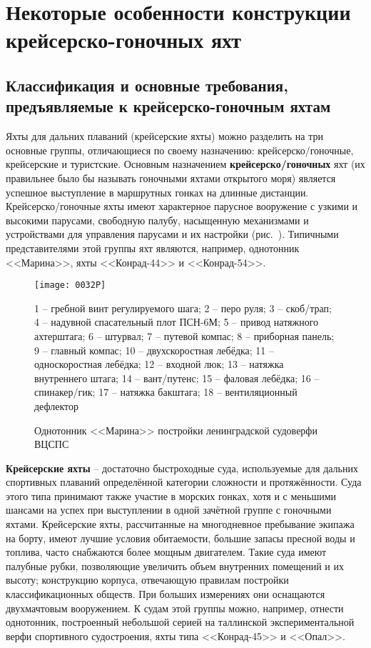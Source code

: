 \chapter{Некоторые особенности конструкции крейсерско-гоночных яхт}

\section{Классификация и основные требования, предъявляемые к крейсерско-гоночным яхтам}

Яхты для дальних плаваний (крейсерские яхты) можно разделить на три
основные группы, отличающиеся по своему назначению:
крейсерско\-/гоночные, крейсерские и туристские.  Основным назначением
\textbf{крейсерско\-/гоночных} яхт (их правильнее было бы называть
гоночными яхтами открытого моря) является успешное выступление в
маршрутных гонках на длинные дистанции. Крейсерско\-/гоночные яхты
имеют характерное парусное вооружение с узкими и высокими парусами,
свободную палубу, насыщенную механизмами и устройствами для управления
парусами и их настройки (рис.~). Типичными представителями
этой группы яхт являются, например, однотонник <<Марина>>, яхты
<<Конрад-44>> и <<Конрад-54>>.

\begin{figure*}[htb]
  \centering
  \texttt{[image: 0032P]}
  \caption{Однотонник <<Марина>> постройки ленинградской судоверфи ВЦСПС}
  \label{fig:32}
  \small
  \centering{}
  1 \--- гребной винт регулируемого шага; 2 \--- перо руля; 3 \--- скоб\-/трап; 4 \--- надувной спасательный плот ПСН-6М; 5 \--- привод натяжного ахтерштага; 6 \--- штурвал; 7 \--- путевой компас; 8 \--- приборная панель; 9 \--- главный компас; 10 \--- двухскоростная лебёдка; 11 \--- односкоростная лебёдка; 12 \--- входной люк; 13 \--- натяжка внутреннего штага; 14 \--- вант\-/путенс; 15 \--- фаловая лебёдка; 16 \--- спинакер\-/гик; 17 \--- натяжка бакштага; 18 \--- вентиляционный дефлектор
\end{figure*}

\textbf{Крейсерские яхты} \--- достаточно
быстроходные суда, используемые для дальних спортивных плаваний
определённой категории сложности и протяжённости. Суда этого типа
принимают также участие в морских гонках, хотя и с меньшими шансами на
успех при выступлении в одной зачётной группе с гоночными
яхтами. Крейсерские яхты, рассчитанные на многодневное пребывание
экипажа на борту, имеют лучшие условия обитаемости, большие запасы
пресной воды и топлива, часто снабжаются более мощным
двигателем. Такие суда имеют палубные рубки, позволяющие увеличить
объем внутренних помещений и их высоту; конструкцию корпуса,
отвечающую правилам постройки классификационных обществ. При больших
измерениях они оснащаются двухмачтовым вооружением. К судам этой
группы можно, например, отнести однотонник, построенный небольшой
серией на таллинской экспериментальной верфи спортивного судостроения,
яхты типа <<Конрад-45>> и <<Опал>>.

